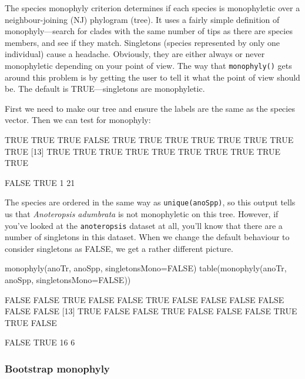 \documentclass{article}
\newcommand{\scinm}{\emph}
\newcommand{\fun}[1]{\texttt{#1}}
\begin{document}
The species monophyly criterion determines if each species is monophyletic over a neighbour-joining (NJ) phylogram (tree). It uses a fairly simple definition of monophyly---search for clades with the same number of tips as there are species members, and see if they match. Singletons (species represented by only one individual) cause a headache. Obviously, they are either always or never monophyletic depending on your point of view. The way that \fun{monophyly()} gets around this problem is by getting the user to tell it what the point of view should be. The default is TRUE---singletons are monophyletic.

First we need to make our tree and ensure the labels are the same as the species vector. Then we can test for monophyly:


\begin{Routput}
 [1]  TRUE  TRUE  TRUE FALSE  TRUE  TRUE  TRUE  TRUE  TRUE  TRUE  TRUE  TRUE
[13]  TRUE  TRUE  TRUE  TRUE  TRUE  TRUE  TRUE  TRUE  TRUE  TRUE

FALSE  TRUE 
    1    21
\end{Routput}

The species are ordered in the same way as \fun{unique(anoSpp)}, so this output tells us that \scinm{Anoteropsis adumbrata} is not monophyletic on this tree. However, if you've looked at the \fun{anoteropsis} dataset at all, you'll know that there are a number of singletons in this dataset. When we change the default behaviour to consider singletons as FALSE, we get a rather different picture.

\begin{console}
monophyly(anoTr, anoSpp, singletonsMono=FALSE)
table(monophyly(anoTr, anoSpp, singletonsMono=FALSE))
\end{console}

\begin{Routput}
 [1] FALSE FALSE  TRUE FALSE FALSE  TRUE FALSE FALSE FALSE FALSE FALSE FALSE
[13]  TRUE FALSE FALSE  TRUE FALSE FALSE FALSE  TRUE  TRUE FALSE

FALSE  TRUE 
   16     6 
\end{Routput}

\subsubsection{Bootstrap monophyly}
\end{document}
